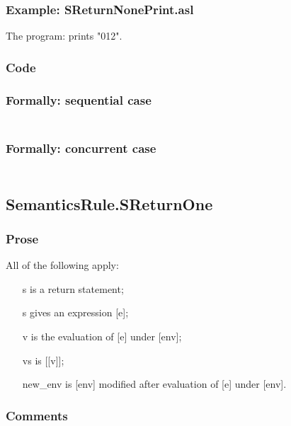 \documentclass{book}
\begin{document}
    \subsubsection{Example: SReturnNonePrint.asl}
    The program:
    prints "012".

  \subsubsection{Code}

  \subsubsection{Formally: sequential case}
  \begin{align}
  \end{align} 

  \subsubsection{Formally: concurrent case}
  \begin{align}
  \end{align} 

\subsection{SemanticsRule.SReturnOne \label{sec:SemanticsRule.SReturnOne}}

    \subsubsection{Prose}
    All of the following apply:
    \begin{itemize}
    \item [s] is a return statement;
    \item [s] gives an expression [e];
    \item [v] is the evaluation of [e] under [env];
    \item [vs] is [[v]];
    \item [new\_env] is [env] modified after evaluation of [e] under [env].
    \end{itemize}

    \subsubsection{Comments}
\end{document}
